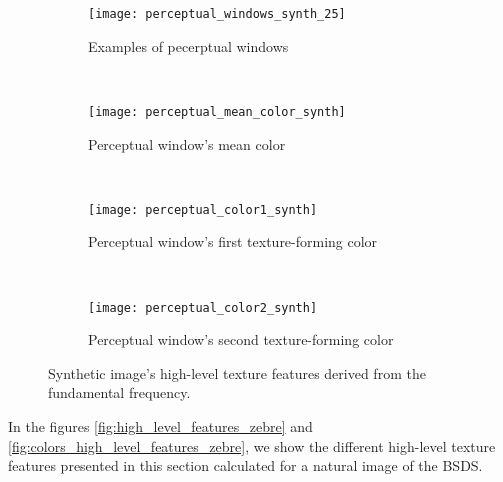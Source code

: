 \begin{figure}[!ht]
    \centering
    \begin{subfigure}[b]{\textwidth}
    	\texttt{[image: perceptual\_windows\_synth\_25]}
        \caption{Examples of pecerptual windows}
        \label{fig:perceptual_windows_synth_25}
    \end{subfigure}\\
    \begin{subfigure}[b]{\textwidth}
    	\texttt{[image: perceptual\_mean\_color\_synth]}
        \caption{Perceptual window's mean color}
        \label{fig:perceptual_mean_color_synth}
    \end{subfigure}\\
    \begin{subfigure}[b]{\textwidth}
    	\texttt{[image: perceptual\_color1\_synth]}
        \caption{Perceptual window's first texture-forming color}
        \label{fig:perceptual_color1_synth}
    \end{subfigure}\\
    \begin{subfigure}[b]{\textwidth}
    	\texttt{[image: perceptual\_color2\_synth]}
        \caption{Perceptual window's second texture-forming color}
        \label{fig:perceptual_color2_synth}
    \end{subfigure}    
                  
    \caption{Synthetic image's high-level texture features derived from the fundamental frequency.}\label{fig:colors_high_level_features_synth}    
\end{figure}


In the figures \ref{fig:high_level_features_zebre} and \ref{fig:colors_high_level_features_zebre}, we show the different high-level texture features presented in this section calculated for a natural image of the BSDS.

